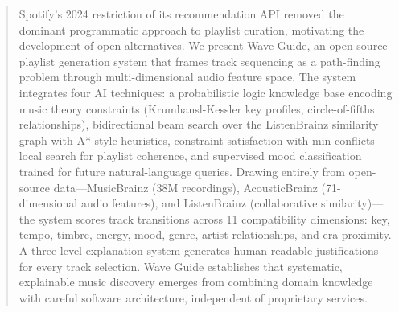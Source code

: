 \begin{abstract}

Spotify's 2024 restriction of its recommendation API removed the dominant programmatic approach to playlist curation, motivating the development of open alternatives. We present Wave Guide, an open-source playlist generation system that frames track sequencing as a path-finding problem through multi-dimensional audio feature space. The system integrates four AI techniques: a probabilistic logic knowledge base encoding music theory constraints (Krumhansl-Kessler key profiles, circle-of-fifths relationships), bidirectional beam search over the ListenBrainz similarity graph with A*-style heuristics, constraint satisfaction with min-conflicts local search for playlist coherence, and supervised mood classification trained for future natural-language queries. Drawing entirely from open-source data---MusicBrainz (38M recordings), AcousticBrainz (71-dimensional audio features), and ListenBrainz (collaborative similarity)---the system scores track transitions across 11 compatibility dimensions: key, tempo, timbre, energy, mood, genre, artist relationships, and era proximity. A three-level explanation system generates human-readable justifications for every track selection. Wave Guide establishes that systematic, explainable music discovery emerges from combining domain knowledge with careful software architecture, independent of proprietary services.

\end{abstract}
